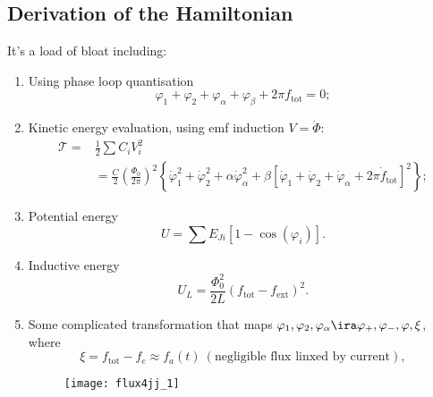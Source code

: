 \subsection{Derivation of the Hamiltonian}
It's a load of bloat including:
\begin{enumerate}
\item Using phase loop quantisation
  \begin{equation}
    \varphi_1 + \varphi_2 + \varphi_\alpha + \varphi_\beta + 2\pi f_\text{tot} = 0;
  \end{equation}
\item    Kinetic    energy     evaluation,    using    emf    induction
  $ V = \dot{\Phi} $:
  \begin{equation}
    \begin{aligned}
      \mathcal{T} = & \frac{1}{2}\sum C_iV_i^2\\
      &                                                               =
      \frac{C}{2}\left(\frac{\Phi_0}{2\pi}\right)^2\left\lbrace\dot{\varphi}^2_1
        +    \dot{\varphi}^2_2    +   \alpha\dot{\varphi}^2_\alpha    +
        \beta\left[\dot{\varphi}_1       +      \dot{\varphi}_2       +
          \dot{\varphi}_\alpha                  +                  2\pi
          \dot{f}_\text{tot}\right]^2\right\rbrace;
    \end{aligned}
  \end{equation}
\item Potential energy
  \begin{equation}
    U = \sum E_{Ji}\left[1 - \cos(\varphi_i)\right].
  \end{equation}
\item Inductive energy
  \begin{equation}
    U_L = \frac{\Phi_0^2}{2L}\left(f_\text{tot} - f_\text{ext}\right)^2.
  \end{equation}
\item      Some      complicated     transformation      that      maps
  $  \varphi_1, \varphi_2,  \varphi_\alpha  \ira \varphi_+,  \varphi_-,
  \varphi, \xi $, where
  \begin{equation}
    \xi = f_\text{tot} - f_e \approx f_a(t)\ (\text{negligible flux linxed by current}),
  \end{equation}
  \begin{figure}[h]
    \centering \texttt{[image: flux4jj\_1]}
  \end{figure}


\end{enumerate}
